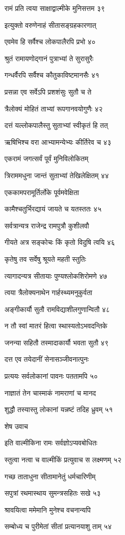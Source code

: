रामं प्रति त्वया साक्षाद्वाल्मीके मुनिसत्तम ३९

इत्युक्तो वरुणेनाहं सीतासङ्ग्रहकारणात्

एवमेव हि सर्वैश्च लोकपालैरपि प्रभो ४०

श्रुतं रामायणोद्गानं पुत्राभ्यां ते सुरासुरैः

गन्धर्वैरपि सर्वैश्च कौतुकाविष्टमानसैः ४१

प्रसन्ना एव सर्वेऽपि प्रशशंसुः सुतौ च ते

त्रैलोक्यं मोहितं ताभ्यां रूपगानवयोगुणैः ४२

दत्तं यल्लोकपालैस्तु सुताभ्यां स्वीकृतं हि तत्

ऋषिभिश्च वरा आभ्यामन्येभ्यः कीर्तिरेव च ४३

एकरामं जगत्सर्वं पूर्वं मुनिविलोकितम्

त्रिराममधुना जान्तं सुताभ्यां तेखिलेक्षितम् ४४

एककामपरामूर्तिर्लोके पूर्वमवेक्षिता

कामैश्चतुर्भिरद्यायं जायते च यतस्ततः ४५

सर्वत्रान्यत्र राजेन्द्र रामपुत्रौ कुशीलवौ

गीयते अत्र सङ्कोचः किं कृतो विदुषि त्वयि ४६

कृतेषु तव सर्वेषु श्रूयते महती स्तुतिः

त्यागादन्यत्र सीतायाः पुण्यश्लोकशिरोमणे ४७

त्वया त्रैलोक्यनाथेन गार्हस्थ्यमनुकुर्वता

अङ्गीकार्यौ सुतौ रामविद्याशीलगुणान्वितौ ४८

न तौ स्वां मातरं हित्वा स्थास्यतोऽभवदन्तिके

जनन्या सहितौ तस्मादाकार्यौ भवता सुतौ ४९

दत्त एव तयेदानीं सेनासञ्जीवनात्पुनः

प्रत्ययः सर्वलोकानां पावनः पततामपि ५०

नाज्ञातं तेन चास्माकं नामराणां च मानद

शुद्धौ तस्यास्तु लोकानां यन्नष्टं तदिह ध्रुवम् ५१

शेष उवाच

इति वाल्मीकिना रामः सर्वज्ञोऽप्यवबोधितः

स्तुत्वा नत्वा च वाल्मीकिं प्रत्युवाच स लक्ष्मणम् ५२

गच्छ ताताधुना सीतामानेतुं धर्मचारिणीम्

सपुत्रां रथमास्थाय सुमन्त्रसहितः सखे ५३

श्रावयित्वा ममेमानि मुनेश्च वचनान्यपि

सम्बोध्य च पुरीमेतां सीतां प्रत्यानयाशु ताम् ५४

